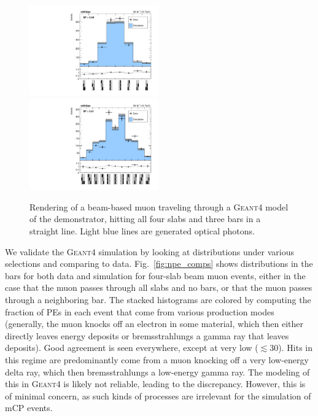 {\begin{figure}[t]
  \begin{center}
    \includegraphics[width=0.495\textwidth]{figs/milliq/muangles_top.pdf}
    \includegraphics[width=0.495\textwidth]{figs/milliq/muangles_side.pdf}
    \caption{Rendering of a beam-based muon traveling through
      a \textsc{Geant4} model of the demonstrator, hitting all
      four slabs and three bars in a straight line. Light blue
      lines are generated optical photons.
            }
    \label{fig:mq_muangles}
  \end{center}
\end{figure}

We validate the \textsc{Geant4} simulation by looking at \Npe distributions
under various selections and comparing to data. Fig.~\ref{fig:npe_comps} shows
\Npe distributions in the bars for both data and simulation for four-slab beam muon
events, either in the case that the muon passes through all slabs and no bars, or
that the muon passes through a neighboring bar. The stacked histograms
are colored by computing the fraction of PEs in each event that come from various
production modes (generally, the muon knocks off an electron in some material, which
then either directly leaves energy deposits or bremsstrahlungs a gamma ray
that leaves deposits). Good agreement is seen everywhere, except at very low \Npe
($\lesssim30$). Hits in this regime are predominantly come from a muon knocking off
a very low-energy delta ray, which then bremsstrahlungs a low-energy gamma ray.
The modeling of this in \textsc{Geant4} is likely not reliable, leading
to the discrepancy. However, this is of minimal concern, as such kinds of processes
are irrelevant for the simulation of mCP events.

}
